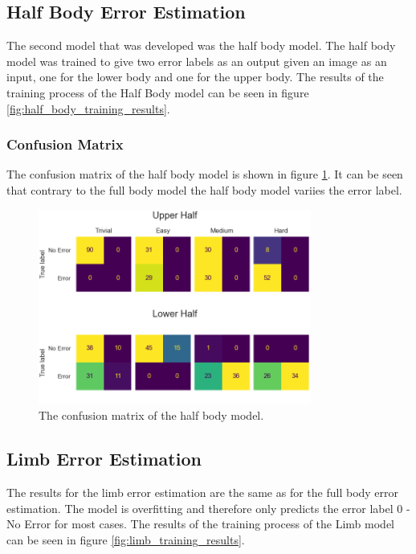 \subsection{Half Body Error Estimation}
\label{sec:half_body}

The second model that was developed was the half body model. The half body model was trained to give two error labels as an output given an image as an input, one for the lower body and one for the upper body. The results of the training process of the Half Body model can be seen in figure \ref{fig:half_body_training_results}.


\subsubsection{Confusion Matrix}

The confusion matrix of the half body model is shown in figure \ref{fig:half_body_confusion_matrix}. It can be seen that contrary to the full body model the half body model variies the error label. 

\begin{figure}
  \centering
  \includegraphics[width=0.8\textwidth]{figures/results/confusion/halves.png}
  \caption[Half Body model confusion matrix]{The confusion matrix of the half body model.}
  \label{fig:half_body_confusion_matrix}
\end{figure}

\subsection{Limb Error Estimation}
\label{sec:limb_error_estimation}

The results for the limb error estimation are the same as for the full body error estimation. The model is overfitting and therefore only predicts the error label $0$ - No Error for most cases. The results of the training process of the Limb model can be seen in figure \ref{fig:limb_training_results}.


